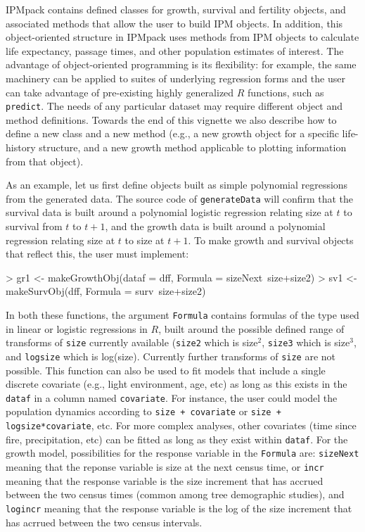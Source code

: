 \documentclass{article}
\begin{document}
IPMpack contains defined classes for growth, survival and fertility objects, and
associated methods that allow the user to build IPM objects. In addition, this
object-oriented structure in IPMpack uses methods from IPM objects to calculate
life expectancy, passage times, and other population estimates of interest. The
advantage of object-oriented programming is its flexibility: for example, the
same machinery can be applied to suites of underlying regression forms and the
user can take advantage of pre-existing highly generalized $R$ functions, such
as {\tt predict}. The needs of any particular dataset may require different
object and method definitions. Towards the end of this vignette we also describe how to define a new class and a new method (e.g., a new growth object for a specific life-history structure, and a new growth method applicable to plotting information from that object).

As an example, let us first define objects built as simple polynomial regressions from the generated data. The source code of {\tt generateData} will confirm that the survival data is built around a polynomial logistic regression relating size at $t$ to survival from $t$ to $t+1$, and the growth data is built around a polynomial regression relating size at $t$ to size at $t+1$. To make growth and survival objects that reflect this, the user must implement:  
\begin{Schunk}
\begin{Sinput}
> gr1 <- makeGrowthObj(dataf = dff, Formula = sizeNext~size+size2)
> sv1 <- makeSurvObj(dff, Formula = surv~size+size2)
\end{Sinput}
\end{Schunk}
In both these functions, the argument {\tt Formula} contains formulas of the type used in linear or logistic regressions in $R$, built around the possible defined range of transforms of  {\tt size} currently available ({\tt size2} which is size$^2$, {\tt size3} which is size$^3$, and {\tt logsize} which is log(size). Currently further transforms of  {\tt size} are not possible. This function can also be used to fit models that include a single discrete covariate (e.g., light environment, age, etc) as long as this exists in the {\tt dataf} in a column named {\tt covariate}. For instance, the user could model the population dynamics according to  {\tt size + covariate} or  {\tt size + logsize*covariate}, etc. For more complex analyses, other covariates (time since fire, precipitation, etc) can be fitted as long as they exist within {\tt dataf}. For the growth model, possibilities for the response variable in the {\tt Formula} are: {\tt sizeNext} meaning that the reponse variable is size at the next census time, or {\tt incr} meaning that the response variable is the size increment that has accrued between the two census times (common among tree demographic studies), and {\tt logincr} meaning that the response variable is the log of the size increment that has acrrued between the two census intervals.
\end{document}
